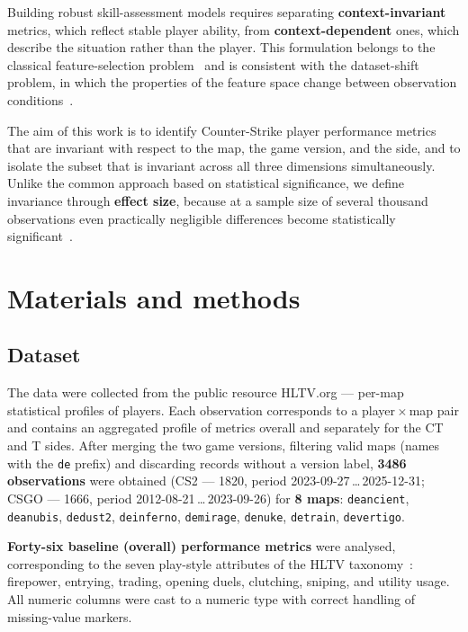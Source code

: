 Building robust skill-assessment models requires separating \textbf{context-invariant} metrics,
which reflect stable player ability, from \textbf{context-dependent} ones, which describe the
situation rather than the player. This formulation belongs to the classical feature-selection
problem~\cite{Guyon} and is consistent with the dataset-shift problem, in which the properties of
the feature space change between observation conditions~\cite{Quinonero}.

The aim of this work is to identify Counter-Strike player performance metrics that are invariant
with respect to the map, the game version, and the side, and to isolate the subset that is
invariant across all three dimensions simultaneously. Unlike the common approach based on
statistical significance, we define invariance through \textbf{effect size}, because at a sample
size of several thousand observations even practically negligible differences become statistically
significant~\cite{Cohen,Sullivan}.

\section{Materials and methods}

\subsection{Dataset}

The data were collected from the public resource HLTV.org --- per-map statistical profiles of
players. Each observation corresponds to a player\,$\times$\,map pair and contains an aggregated
profile of metrics overall and separately for the CT and T sides. After merging the two game
versions, filtering valid maps (names with the \texttt{de\us{}} prefix) and discarding records
without a version label, \textbf{3486 observations} were obtained (CS2 --- 1820, period
2023-09-27\,\ldots\,2025-12-31; CSGO --- 1666, period 2012-08-21\,\ldots\,2023-09-26) for
\textbf{8 maps}: \texttt{de\us{}ancient}, \texttt{de\us{}anubis}, \texttt{de\us{}dust2},
\texttt{de\us{}inferno}, \texttt{de\us{}mirage}, \texttt{de\us{}nuke}, \texttt{de\us{}train},
\texttt{de\us{}vertigo}.

\textbf{Forty-six baseline (overall) performance metrics} were analysed, corresponding to the
seven play-style attributes of the HLTV taxonomy~\cite{HLTV}: firepower, entrying, trading,
opening duels, clutching, sniping, and utility usage. All numeric columns were cast to a numeric
type with correct handling of missing-value markers.

